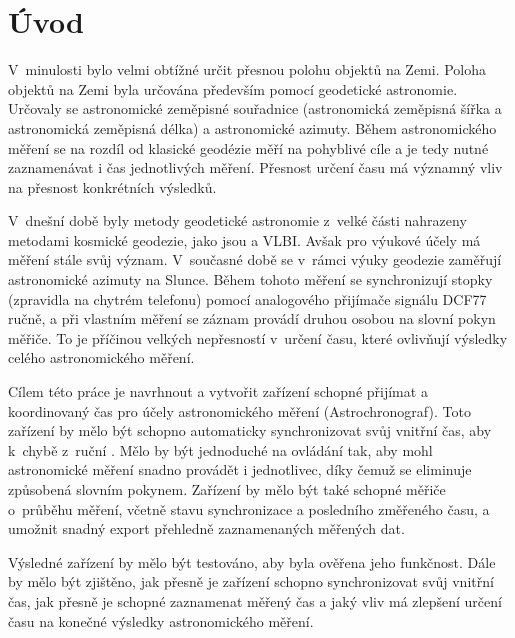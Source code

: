 \chapter{Úvod}
\label{1-uvod}
V~minulosti bylo velmi obtížné určit přesnou polohu objektů na Zemi. Poloha objektů na Zemi byla určována především pomocí geodetické astronomie. Určovaly se astronomické zeměpisné souřadnice (astronomická zeměpisná šířka a astronomická zeměpisná délka) a astronomické azimuty. Během astronomického měření se na rozdíl od klasické geodézie měří na pohyblivé cíle a je tedy nutné zaznamenávat i čas jednotlivých měření. Přesnost určení času má významný vliv na přesnost konkrétních výsledků. 

V~dnešní době byly metody geodetické astronomie z~velké části nahrazeny metodami kosmické geodezie, jako jsou  a VLBI. Avšak pro výukové účely má  měření stále svůj význam. V~současné době se v~rámci výuky  geodezie zaměřují astronomické azimuty na Slunce. Během tohoto měření se synchro\-nizují stopky (zpravidla na chytrém telefonu) pomocí analogového přijímače signálu DCF77 ručně, a při vlastním měření se záznam provádí druhou osobou na slovní pokyn měřiče. To je příčinou velkých nepřesností v~určení času, které  ovlivňují výsledky celého astronomického měření.

Cílem této práce je navrhnout a vytvořit zařízení schopné přijímat a  koordinovaný čas pro účely astronomického měření (Astrochronograf). Toto zařízení by mělo být schopno automaticky synchronizovat svůj vnitřní čas, aby  k~chybě z~ruční . Mělo by být jednoduché na ovládání tak, aby mohl astronomické měření snadno provádět i jednotlivec, díky čemuž se eliminuje  způsobená slovním pokynem. Zařízení by mělo být také schopné  měřiče o~průběhu měření, včetně stavu synchronizace a posledního změřeného času, a umožnit snadný export přehledně zaznamenaných měřených dat.

Výsledné zařízení by mělo být testováno, aby byla ověřena jeho funkčnost. Dále by mělo být zjištěno, jak přesně je zařízení schopno synchronizovat svůj vnitřní čas, jak přesně je schopné zaznamenat měřený čas a jaký vliv má zlepšení určení času na konečné výsledky astronomického měření.